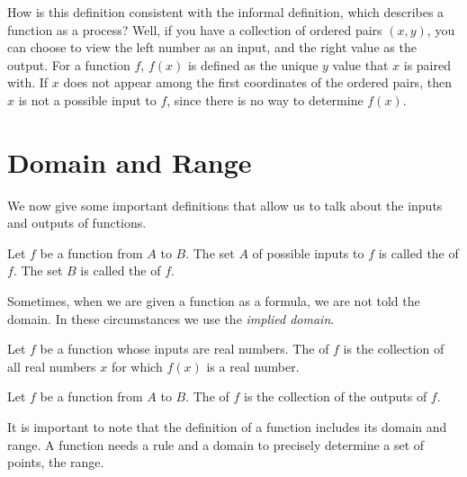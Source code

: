 \documentclass[noauthor, nooutcomes]{ximera}
\begin{document}
How is this definition consistent with the informal definition, which describes a function as a process? Well, if you have a collection of ordered pairs $(x,y)$, you can choose to view the left number as an input, and the right value as the output. For a function $f$, $f(x)$ is defined as the unique $y$ value that $x$ is paired with. If $x$ does not appear among the first coordinates of the ordered pairs, then $x$ is not a possible input to $f$, since there is no way to determine $f(x)$. 


\section{Domain and Range}
We now give some important definitions that allow us to talk about the inputs and outputs of functions. 

\begin{definition}
		Let $f$ be a function from $A$ to $B$. The set $A$ of possible inputs to $f$ is called the  of $f$. The set $B$ is called the  of $f$.
	\end{definition}

	Sometimes, when we are given a function as a formula, we are not told the domain. In these circumstances we use the \emph{implied domain}.
	\begin{definition}
		Let $f$ be a function whose inputs are real numbers. The  of $f$ is the collection of all real numbers $x$ for which $f(x)$ is a real number.
	\end{definition}

	\begin{definition}
		Let $f$ be a function from $A$ to $B$. The  of $f$ is the collection of the outputs of $f$.
	\end{definition}

It is important to note that the definition of a function includes its domain and range. A function needs a rule and a domain to precisely determine a set of points, the range.
\end{document}
